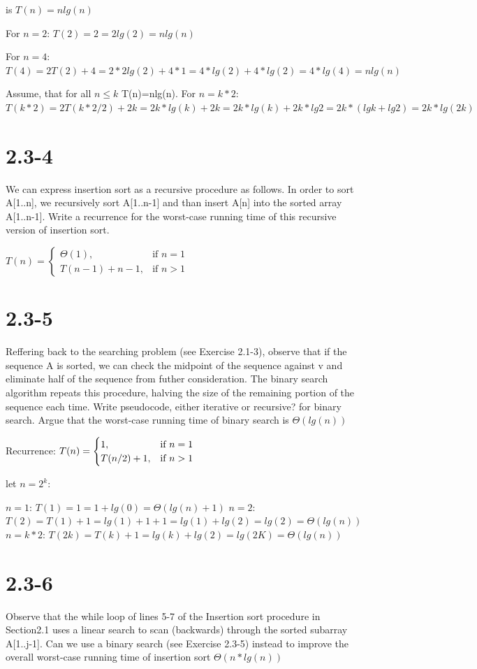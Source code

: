 \documentclass{article}
\begin{document}
is $ T(n) = nlg(n)$

For $n=2$:
$T(2)=2=2lg(2)=nlg(n)$

For $n=4$:
$T(4)=2T(2)+4=2*2lg(2)+4*1=4*lg(2)+4*lg(2)=4*lg(4)=nlg(n)$

Assume, that for all $n \le k$ T(n)=nlg(n).
For $n = k*2$: $T(k*2)=2T(k*2/2)+ 2k=2k*lg(k)+2k=2k*lg(k) +2k*lg2=2k*(lgk + lg2)=2k*lg(2k)$

\section{2.3-4}
We can express insertion sort as a recursive procedure as follows. In order to sort A[1..n], we recursively sort A[1..n-1] and than insert A[n] into the sorted array A[1..n-1]. Write a recurrence for the worst-case running time of this recursive version of insertion sort.

$T(n) = 
\begin{cases}
 \Theta(1), & \mbox{if  $n= 1$} \\
 T(n-1)+n-1, & \mbox{if $n > 1$} 
\end{cases}$ 

\section{2.3-5}
Reffering back to the searching problem (see Exercise 2.1-3), observe that if the sequence A is sorted, we can check the midpoint of the sequence against v and eliminate half of the sequence from futher consideration. The binary search algorithm repeats this procedure, halving the size of the remaining portion of the sequence each time. Write pseudocode, either iterative or recursive? for binary search. Argue that the worst-case running time of binary search is $\Theta(lg(n))$



Recurrence:
$T(n) = 
\begin{cases}
1, & \mbox{if  $n= 1$} \\
 T(n/2)+1, & \mbox{if $ n > 1$} 
\end{cases}$ 
 
let $n = 2^k$:

$n=1$: $T(1) = 1 = 1 + lg(0) = \Theta(lg(n)+ 1)$
$n=2$: $T(2) = T(1)+ 1 =  lg(1) + 1 +  1 = lg(1) + lg(2) = lg(2) = \Theta(lg(n))$
$n=k*2$: $T(2k)=T(k) + 1 = lg(k) + lg(2) = lg(2K)= \Theta(lg(n))$

\section{2.3-6}
Observe that the while loop of lines 5-7 of the Insertion sort procedure in Section2.1 uses a linear search to scan (backwards) through the sorted subarray A[1..j-1]. Can we use a binary search (see Exercise 2.3-5) instead to improve the overall worst-case running time of insertion sort $\Theta(n*lg(n))$
\end{document}
